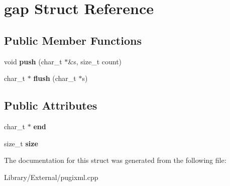 \hypertarget{structgap}{}\section{gap Struct Reference}
\label{structgap}
\subsection*{Public Member Functions}
\begin{DoxyCompactItemize}
\item 
\hypertarget{structgap_a9c0d0b12bc778c8439c8aec7747ab2b0}{}void {\bfseries push} (char\+\_\+t $\ast$\&s, size\+\_\+t count)\label{structgap_a9c0d0b12bc778c8439c8aec7747ab2b0}

\item 
\hypertarget{structgap_a176c58ee8d57c41b91ae9f00d5e8cab5}{}char\+\_\+t $\ast$ {\bfseries flush} (char\+\_\+t $\ast$s)\label{structgap_a176c58ee8d57c41b91ae9f00d5e8cab5}

\end{DoxyCompactItemize}
\subsection*{Public Attributes}
\begin{DoxyCompactItemize}
\item 
\hypertarget{structgap_a1fafd4d9909a3413f723f24e46dfde0e}{}char\+\_\+t $\ast$ {\bfseries end}\label{structgap_a1fafd4d9909a3413f723f24e46dfde0e}

\item 
\hypertarget{structgap_ad5bb3597ade78d89bbe0e300748ad508}{}size\+\_\+t {\bfseries size}\label{structgap_ad5bb3597ade78d89bbe0e300748ad508}

\end{DoxyCompactItemize}


The documentation for this struct was generated from the following file\+:\begin{DoxyCompactItemize}
\item 
Library/\+External/pugixml.\+cpp\end{DoxyCompactItemize}
